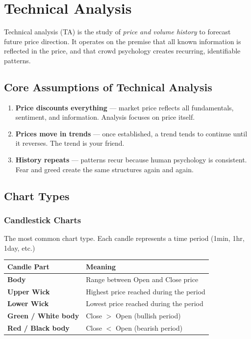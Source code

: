 
\chapter{Technical Analysis}

\begin{notebox}
Technical analysis (TA) is the study of \emph{price and volume history} to forecast future
price direction. It operates on the premise that all known information is reflected in the price,
and that crowd psychology creates recurring, identifiable patterns.
\end{notebox}

\section{Core Assumptions of Technical Analysis}

\begin{enumerate}[label=\textbf{\arabic*.}]
  \item \textbf{Price discounts everything} — market price reflects all fundamentals, sentiment,
        and information. Analysis focuses on price itself.
  \item \textbf{Prices move in trends} — once established, a trend tends to continue until it
        reverses. The trend is your friend.
  \item \textbf{History repeats} — patterns recur because human psychology is consistent.
        Fear and greed create the same structures again and again.
\end{enumerate}

\section{Chart Types}

\subsection{Candlestick Charts}
The most common chart type. Each candle represents a time period (1min, 1hr, 1day, etc.)

\begin{center}
\begin{tabular}{>{\bfseries}p{3cm} p{9.5cm}}
\toprule
Candle Part & Meaning \\
\midrule
Body & Range between Open and Close price \\
Upper Wick & Highest price reached during the period \\
Lower Wick & Lowest price reached during the period \\
Green / White body & Close $>$ Open (bullish period) \\
Red / Black body & Close $<$ Open (bearish period) \\
\bottomrule
\end{tabular}
\end{center}

